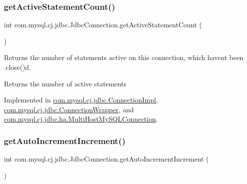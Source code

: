 \mbox{\label{interfacecom_1_1mysql_1_1cj_1_1jdbc_1_1_jdbc_connection_aea218879f6bae7ed7717a257876582db}} 
\subsubsection{\texorpdfstring{get\+Active\+Statement\+Count()}{getActiveStatementCount()}}
{\footnotesize\ttfamily int com.\+mysql.\+cj.\+jdbc.\+Jdbc\+Connection.\+get\+Active\+Statement\+Count (\begin{DoxyParamCaption}{ }\end{DoxyParamCaption})}

Returns the number of statements active on this connection, which haven\textquotesingle{}t been .close()d.

\begin{DoxyReturn}{Returns}
the number of active statements 
\end{DoxyReturn}


Implemented in \mbox{\hyperlink{classcom_1_1mysql_1_1cj_1_1jdbc_1_1_connection_impl_a858f89a9745e2ffc3e748c91286d7862}{com.\+mysql.\+cj.\+jdbc.\+Connection\+Impl}}, \mbox{\hyperlink{classcom_1_1mysql_1_1cj_1_1jdbc_1_1_connection_wrapper_ad356fedacaf160823158cc253f99322a}{com.\+mysql.\+cj.\+jdbc.\+Connection\+Wrapper}}, and \mbox{\hyperlink{classcom_1_1mysql_1_1cj_1_1jdbc_1_1ha_1_1_multi_host_my_s_q_l_connection_a5f85b0597c870954959bd5c2a48ae28b}{com.\+mysql.\+cj.\+jdbc.\+ha.\+Multi\+Host\+My\+S\+Q\+L\+Connection}}.

\mbox{\label{interfacecom_1_1mysql_1_1cj_1_1jdbc_1_1_jdbc_connection_a06ded1274e682178c67fdb86f09fed5a}} 
\subsubsection{\texorpdfstring{get\+Auto\+Increment\+Increment()}{getAutoIncrementIncrement()}}
{\footnotesize\ttfamily int com.\+mysql.\+cj.\+jdbc.\+Jdbc\+Connection.\+get\+Auto\+Increment\+Increment (\begin{DoxyParamCaption}{ }\end{DoxyParamCaption})}

